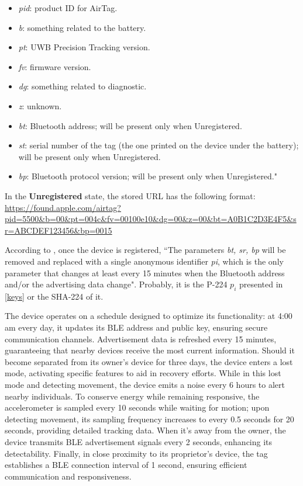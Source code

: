 \documentclass[english]{article}
\begin{document}
\begin{itemize}
  \item \textit{pid}: product ID for AirTag.
  \item \textit{b}: something related to the battery.
  \item \textit{pt}: UWB Precision Tracking version.
  \item \textit{fv}: firmware version.
  \item \textit{dg}: something related to diagnostic.
  \item \textit{z}: unknown.
  \item \textit{bt}: Bluetooth address; will be present only when Unregistered.
  \item \textit{st}: serial number of the tag (the one printed on the device under the battery); will be present only when Unregistered.
  \item \textit{bp}: Bluetooth protocol version; will be present only when Unregistered."
\end{itemize}
In the \textbf{Unregistered} state, the stored URL has the following format:
\url{https://found.apple.com/airtag?pid=5500&b=00&pt=004c&fv=00100e10&dg=00&z=00&bt=A0B1C2D3E4F5&sr=ABCDEF123456&bp=0015}

According to \cite{reverse},
once the device is registered, ``The parameters \textit{bt, sr, bp} will be removed and replaced with a single anonymous identifier \textit{pi}, which is the only parameter that changes at least every 15 minutes when the Bluetooth address and/or the advertising data change". Probably, it is the P-224 $p_i$ presented in \ref{keys} or the SHA-224 of it. 

The device operates on a schedule designed to optimize its functionality:
at 4:00 am every day, it updates its BLE address and public key, ensuring secure communication channels.
Advertisement data is refreshed every 15 minutes, guaranteeing that nearby devices receive the most current information.
Should it become separated from its owner's device for three days, the device enters a lost mode, activating specific features to aid in recovery efforts.
While in this lost mode and detecting movement, the device emits a noise every 6 hours to alert nearby individuals.
To conserve energy while remaining responsive, the accelerometer is sampled every 10 seconds while waiting for motion; upon detecting movement, its sampling frequency increases to every 0.5 seconds for 20 seconds, providing detailed tracking data.
When it's away from the owner, the device transmits BLE advertisement signals every 2 seconds, enhancing its detectability.
Finally, in close proximity to its proprietor's device, the tag establishes a BLE connection interval of 1 second, ensuring efficient communication and responsiveness.
\end{document}
